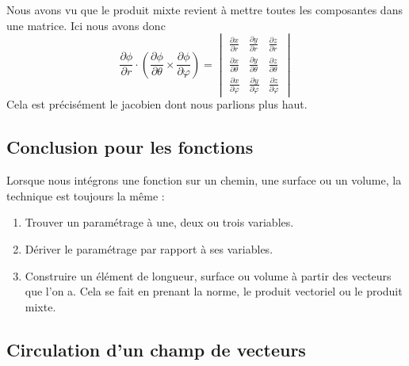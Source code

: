 Nous avons vu que le produit mixte revient à mettre toutes les composantes dans une matrice. Ici nous avons donc
\begin{equation}
	\frac{ \partial \phi }{ \partial r }\cdot\left( \frac{ \partial \phi }{ \partial \theta }\times\frac{ \partial \phi }{ \partial \varphi } \right)=\begin{vmatrix}
		\frac{ \partial x }{ \partial r }       & \frac{ \partial y }{ \partial r }       & \frac{ \partial z }{ \partial r }       \\
		\frac{ \partial x }{ \partial \theta }  & \frac{ \partial y }{ \partial \theta }  & \frac{ \partial z }{ \partial \theta }  \\
		\frac{ \partial x }{ \partial \varphi } & \frac{ \partial y }{ \partial \varphi } & \frac{ \partial z }{ \partial \varphi }
	\end{vmatrix}
\end{equation}
Cela est précisément le jacobien dont nous parlions plus haut.

\subsection{Conclusion pour les fonctions}

Lorsque nous intégrons une fonction sur un chemin, une surface ou un volume, la technique est toujours la même :
\begin{enumerate}
	\item
	      Trouver un paramétrage à une, deux ou trois variables.
	\item
	      Dériver le paramétrage par rapport à ses variables.
	\item
	      Construire un élément de longueur, surface ou volume à partir des vecteurs que l'on a. Cela se fait en prenant la norme, le produit vectoriel ou le produit mixte.
\end{enumerate}

\subsection{Circulation d'un champ de vecteurs}

